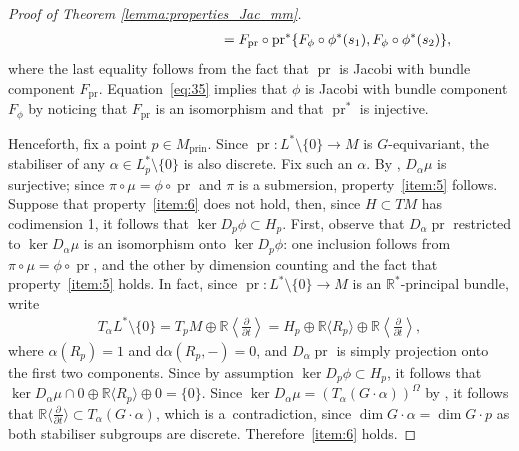 \documentclass[pdftex]{sigma}
\numberwithin{equation}{section}
\newcommand{\de}{\mathrm{d}} %
\newcommand{\RR}{\mathbb{R}}
\begin{document}
\begin{proof}[Proof of Theorem \ref{lemma:properties_Jac_mm}]
\begin{gather}
\hphantom{F_{\operatorname{pr}} \circ \operatorname{pr}^* \circ F_{\phi} \circ \phi^*\{s_1,s_2\}}{}
=F_{\operatorname{pr}} \circ \operatorname{pr}^* \{F_{\phi} \circ \phi^*(s_1), F_{\phi} \circ \phi^*(s_2)\},\label{eq:35}
\end{gather}
where the last equality follows from the fact that $\operatorname{pr}$ is Jacobi with bundle component $F_{\operatorname{pr}}$. Equation~\eqref{eq:35} implies that $\phi$ is Jacobi with bundle component $F_{\phi}$ by noticing that $F_{\operatorname{pr}}$ is an isomorphism and that $\operatorname{pr}^*$ is injective.

Henceforth, f\/ix a point $p \in M_{\mathrm{prin}}$. Since $\operatorname{pr} \colon L^* \setminus \{0\} \to M$ is $G$-equivariant, the stabiliser of any $\alpha \in L_p^* \setminus \{0\}$ is also discrete. Fix such an $\alpha$. By \cite[Corollary~5.1.2]{gui_sja}, $D_{\alpha} \mu$ is surjective; since $\pi \circ \mu = \phi \circ \operatorname{pr}$ and $\pi$ is a submersion, property~\ref{item:5} follows. Suppose that property~\ref{item:6} does not hold, then, since $H \subset TM$ has codimension 1, it follows that $\ker D_p \phi \subset H_p$. First, observe that $D_{\alpha} \operatorname{pr}$ restricted to $\ker D_{\alpha} \mu$ is an isomorphism onto $\ker D_p \phi$: one inclusion follows from $\pi \circ \mu = \phi \circ \operatorname{pr}$, and the other by dimension counting and the fact that property~\ref{item:5} holds. In fact, since $\operatorname{pr}\colon L^* \setminus \{0\} \to M$ is an $\RR^*$-principal bundle, write
 \begin{gather*}
 T_{\alpha} L^* \setminus \{0\} = T_p M \oplus \RR \left\langle \frac{\partial}{\partial t} \right\rangle = H_p \oplus \RR\langle R_p
 \rangle \oplus \RR \left\langle \frac{\partial}{\partial t} \right\rangle,
 \end{gather*}
where $\alpha(R_p) = 1$ and $\de \alpha(R_p,-) = 0$, and $D_{\alpha}\operatorname{pr}$ is simply projection onto the f\/irst two components. Since by assumption $\ker D_p \phi \subset H_p$, it follows that $\ker D_{\alpha} \mu \cap 0 \oplus \RR\langle R_p \rangle \oplus 0 = \{0\}$. Since $\ker D_{\alpha} \mu = ( T_{\alpha}(G \cdot \alpha))^{\Omega}$ by \cite[Corollary~5.1.4]{gui_sja}, it follows that $\RR \langle \frac{\partial}{\partial t} \rangle \subset T_{\alpha}(G \cdot \alpha)$, which is a~contradiction, since $\dim G \cdot \alpha = \dim G \cdot p$ as both stabiliser subgroups are discrete. Therefore~\ref{item:6} holds.


\end{proof}
\end{document}
